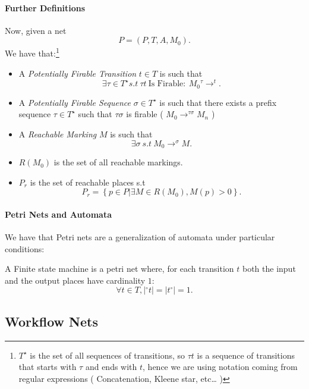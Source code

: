 \documentclass[openright, twoside, twocolumn]{report}
\begin{document}
  \paragraph{Further Definitions}

    Now, given a net \[
      P = (P, T, A, M_0).\] We have that:\footnote{
        $T^{\star}$ is the set of all sequences of transitions, so $\tau t$ is a sequence of transitions
        that starts with $\tau$ and ends with $t$, hence we are using notation coming from regular expressions (
          Concatenation, Kleene star, etc\dots
        )
      }
    \begin{itemize}
      \item A \emph{Potentially Firable Transition}  $t \in T$  is such that
      \[
        \exists \tau \in T^{\star} s.t\ \tau t\ \text{Is Firable}:\ M_0 {}^{\tau}\to^{t}
      .\]
      \item A \emph{Potentially Firable Sequence} $\sigma \in T^{\star}$ is such that
      there exists a prefix sequence $\tau \in T^{\star}$ such that $\tau \sigma$ is firable (
        $M_0 \to^{\tau \sigma} M_n$
        )
      \item A \emph{Reachable Marking} $M$ is such that
      \[
         \exists \sigma\ s.t\ M_0 \to^{\sigma} M
      .\]
      \item $R( M_0)$ is the set of all reachable markings.
      \item $P_r$ is the set of reachable places s.t
      \[
        P_r = \left\{ p \in  P | \exists  M \in  R( M_0), M(p) > 0 \right\}
      .\]
    \end{itemize}

    \paragraph{Petri Nets and Automata}

    We have that Petri nets are a generalization of automata under particular conditions:

    \begin{definition}
      A Finite state machine is a petri net where, for each transition $t$ both
      the input and the output places have cardinality $1$:
      \[
        \forall  t \in  T, |{}^{\circ}t| = |t^{\circ}| = 1
      .\]
    \end{definition}

    \subsection{Workflow Nets}
\end{document}
